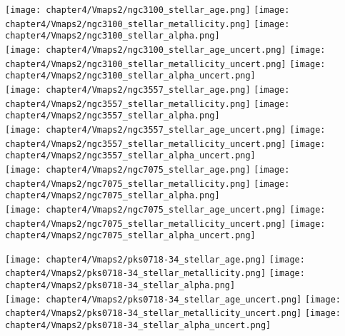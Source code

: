 \begin{figure*}
	\centering
	\texttt{[image: chapter4/Vmaps2/ngc3100\_stellar\_age.png]}
	\texttt{[image: chapter4/Vmaps2/ngc3100\_stellar\_metallicity.png]}
	\texttt{[image: chapter4/Vmaps2/ngc3100\_stellar\_alpha.png]}
	\\
	\texttt{[image: chapter4/Vmaps2/ngc3100\_stellar\_age\_uncert.png]}
	\texttt{[image: chapter4/Vmaps2/ngc3100\_stellar\_metallicity\_uncert.png]}
	\texttt{[image: chapter4/Vmaps2/ngc3100\_stellar\_alpha\_uncert.png]}
	\\
	\texttt{[image: chapter4/Vmaps2/ngc3557\_stellar\_age.png]}
	\texttt{[image: chapter4/Vmaps2/ngc3557\_stellar\_metallicity.png]}
	\texttt{[image: chapter4/Vmaps2/ngc3557\_stellar\_alpha.png]}
	\\
	\texttt{[image: chapter4/Vmaps2/ngc3557\_stellar\_age\_uncert.png]}
	\texttt{[image: chapter4/Vmaps2/ngc3557\_stellar\_metallicity\_uncert.png]}
	\texttt{[image: chapter4/Vmaps2/ngc3557\_stellar\_alpha\_uncert.png]}
	\\
	\texttt{[image: chapter4/Vmaps2/ngc7075\_stellar\_age.png]}
	\texttt{[image: chapter4/Vmaps2/ngc7075\_stellar\_metallicity.png]}
	\texttt{[image: chapter4/Vmaps2/ngc7075\_stellar\_alpha.png]}
	\\
	\texttt{[image: chapter4/Vmaps2/ngc7075\_stellar\_age\_uncert.png]}
	\texttt{[image: chapter4/Vmaps2/ngc7075\_stellar\_metallicity\_uncert.png]}
	\texttt{[image: chapter4/Vmaps2/ngc7075\_stellar\_alpha\_uncert.png]}
	\\
\end{figure*}

\begin{figure*}
	\centering
	\texttt{[image: chapter4/Vmaps2/pks0718-34\_stellar\_age.png]}
	\texttt{[image: chapter4/Vmaps2/pks0718-34\_stellar\_metallicity.png]}
	\texttt{[image: chapter4/Vmaps2/pks0718-34\_stellar\_alpha.png]}
	\\
	\texttt{[image: chapter4/Vmaps2/pks0718-34\_stellar\_age\_uncert.png]}
	\texttt{[image: chapter4/Vmaps2/pks0718-34\_stellar\_metallicity\_uncert.png]}
	\texttt{[image: chapter4/Vmaps2/pks0718-34\_stellar\_alpha\_uncert.png]}
	\\
\end{figure*}

